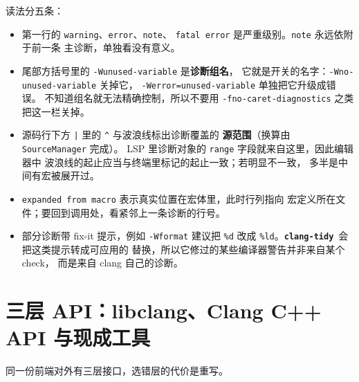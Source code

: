 \documentclass[12pt,a4paper,fontset=fandol]{ctexbook}
\newcommand{\Bk}{\discretionary{}{}{}}
\newcommand{\Lib}[1]{\textbf{\texttt{#1}}}
\newcommand{\Tidy}{\Lib{clang-tidy}}
\begin{document}
读法分五条：

\begin{itemize}
  \item 第一行的 \texttt{warning}、\texttt{error}、\texttt{note}、
        \texttt{fatal error} 是严重级别。\texttt{note} 永远依附于前一条
        主诊断，单独看没有意义。
  \item 尾部方括号里的 \texttt{-Wunused-{\Bk}variable} 是\textbf{诊断组名}，
        它就是开关的名字：\texttt{-Wno-{\Bk}unused-{\Bk}variable} 关掉它，
        \texttt{-Werror=unused-{\Bk}variable} 单独把它升级成错误。
        不知道组名就无法精确控制，所以不要用
        \texttt{-fno-{\Bk}caret-{\Bk}diagnostics} 之类把这一栏关掉。
  \item 源码行下方 \texttt{|} 里的 \texttt{\^{}} 与波浪线标出诊断覆盖的
        \textbf{源范围}（换算由 \texttt{SourceManager} 完成）。
        LSP 里诊断对象的 \texttt{range} 字段就来自这里，因此编辑器中
        波浪线的起止应当与终端里标记的起止一致；若明显不一致，
        多半是中间有宏被展开过。
  \item \texttt{expanded from macro} 表示真实位置在宏体里，此时行列指向
        宏定义所在文件；要回到调用处，看紧邻上一条诊断的行号。
  \item 部分诊断带 fix-it 提示，例如 \texttt{-Wformat} 建议把
        \texttt{\%d} 改成 \texttt{\%ld}。\Tidy\ 会把这类提示转成可应用的
        替换，所以它修过的某些编译器警告并非来自某个 check，
        而是来自 clang 自己的诊断。
\end{itemize}

\section{三层 API：libclang、Clang C++ API 与现成工具}
\label{sec:ch01-s3}

同一份前端对外有三层接口，选错层的代价是重写。
\end{document}
